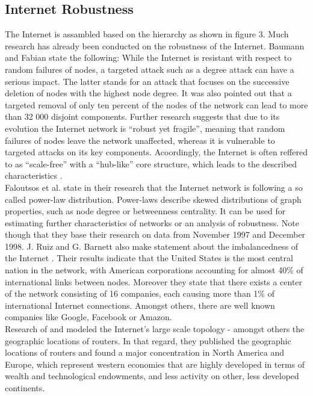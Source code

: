 \documentclass[conference, 11pt]{IEEEtran}
\begin{document}
\subsection{Internet Robustness}
The Internet is assambled based on the hierarchy as shown in figure 3. Much research has already been conducted on the robustness of the Internet. Baumann and Fabian \cite{howRobust} state the following: While the Internet is resistant with respect to random failures of nodes, a targeted attack such as a degree attack can have a serious impact. The latter stands for an attack that focuses on the successive deletion of nodes with the highest node degree. It was also pointed out that a targeted removal of only ten percent of the nodes of the network can lead to more than 32 000 disjoint components. Further research suggests that due to its evolution the Internet network  is ``robust yet fragile''\cite{RYF}, meaning that random failures of nodes leave the network unaffected, whereas it is vulnerable to targeted attacks on its key components. Acoordingly, the Internet is often reffered to as ``scale-free'' with a ``hub-like'' core structure, which leads to the described characteristics \cite{RYF}. \\ \linebreak Faloutsos et al. \cite{powerlawCitation} state in their research that the Internet network is following a so called power-law distribution. Power-laws describe skewed distributions of graph properties, such as node degree or betweenness centrality. It can be used for estimating further characteristics of networks or an analysis of robustness. Note though that they base their research on data from November 1997 and December 1998. J. Ruiz and G. Barnett also make statement about the imbalancedness of the Internet \cite{owningInternet}. Their results indicate that the United States is the most central nation in the network, with American corporations accounting for almost 40\% of international links between nodes. Moreover they state that there exists a center of the network consisting of 16 companies, each causing more than 1\% of international Internet connections. Amongst others, there are well known companies like Google, Facebook or Amazon. \\ \linebreak
Research of \cite{geoResearch} and \cite{geoVul} modeled the Internet's large scale topology - amongst others the geographic locations of routers. In that regard, they published the geographic locations of routers and found a major concentration in North America and Europe, which represent western economies that are highly developed in terms of wealth and technological endowments, and less activity on other, less developed continents.\\  \linebreak
 
\end{document}
